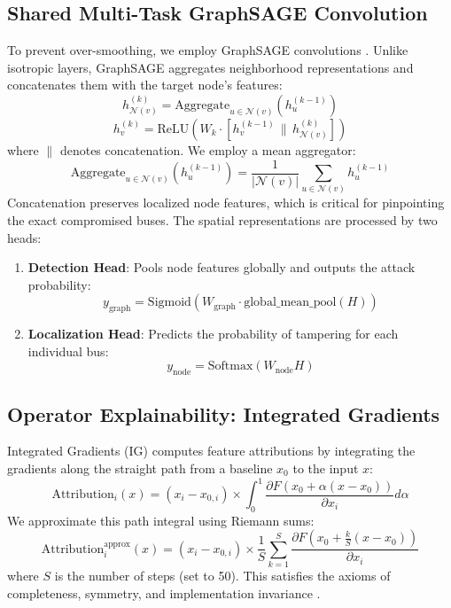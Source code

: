 \documentclass[conference]{IEEEtran}
\begin{document}
\subsection{Shared Multi-Task GraphSAGE Convolution}
To prevent over-smoothing, we employ GraphSAGE convolutions \cite{b8}. Unlike isotropic layers, GraphSAGE aggregates neighborhood representations and concatenates them with the target node's features:
\begin{equation}
h_{\mathcal{N}(v)}^{(k)} = \text{Aggregate}_{u \in \mathcal{N}(v)} \left( h_u^{(k-1)} \right)
\end{equation}
\begin{equation}
h_v^{(k)} = \text{ReLU} \left( W_k \cdot \left[ h_v^{(k-1)} \,\|\, h_{\mathcal{N}(v)}^{(k)} \right] \right)
\end{equation}
where $\|$ denotes concatenation. We employ a mean aggregator:
\begin{equation}
\text{Aggregate}_{u \in \mathcal{N}(v)} \left( h_u^{(k-1)} \right) = \frac{1}{|\mathcal{N}(v)|} \sum_{u \in \mathcal{N}(v)} h_u^{(k-1)}
\end{equation}
Concatenation preserves localized node features, which is critical for pinpointing the exact compromised buses. The spatial representations are processed by two heads:
\begin{enumerate}
    \item \textbf{Detection Head}: Pools node features globally and outputs the attack probability:
    \begin{equation}
    y_{\text{graph}} = \text{Sigmoid}\left(W_{\text{graph}} \cdot \text{global\_mean\_pool}(H)\right)
    \end{equation}
    \item \textbf{Localization Head}: Predicts the probability of tampering for each individual bus:
    \begin{equation}
    y_{\text{node}} = \text{Softmax}(W_{\text{node}} H)
    \end{equation}
\end{enumerate}

\subsection{Operator Explainability: Integrated Gradients}
Integrated Gradients (IG) computes feature attributions by integrating the gradients along the straight path from a baseline $x_0$ to the input $x$:
\begin{equation}
\text{Attribution}_i(x) = (x_i - x_{0,i}) \times \int_{0}^{1} \frac{\partial F(x_0 + \alpha(x - x_0))}{\partial x_i} d\alpha
\end{equation}
We approximate this path integral using Riemann sums:
\begin{equation}
\text{Attribution}_i^{\text{approx}}(x) = (x_i - x_{0,i}) \times \frac{1}{S} \sum_{k=1}^S \frac{\partial F\left(x_0 + \frac{k}{S}(x - x_0)\right)}{\partial x_i}
\end{equation}
where $S$ is the number of steps (set to 50). This satisfies the axioms of completeness, symmetry, and implementation invariance \cite{b7}.
\end{document}
